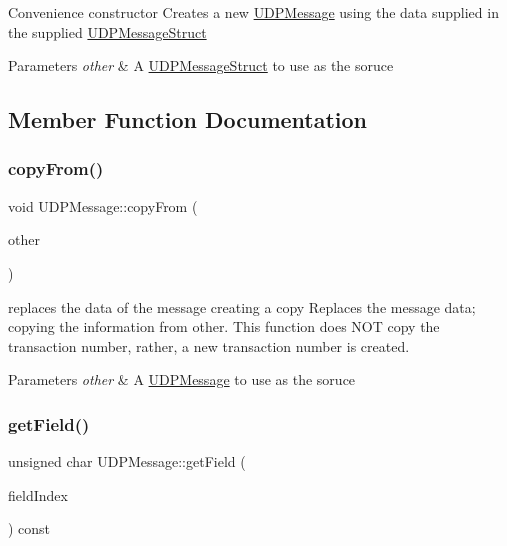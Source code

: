Convenience constructor Creates a new \hyperlink{class_u_d_p_message}{U\+D\+P\+Message} using the data supplied in the supplied \hyperlink{struct_u_d_p_message_struct}{U\+D\+P\+Message\+Struct} 
\begin{DoxyParams}{Parameters}
{\em other} & A \hyperlink{struct_u_d_p_message_struct}{U\+D\+P\+Message\+Struct} to use as the soruce \\
\hline
\end{DoxyParams}


\subsection{Member Function Documentation}
\mbox{\label{class_u_d_p_message_a313c116a2f7f0f134745ed0c4a759733}} 
\subsubsection{\texorpdfstring{copy\+From()}{copyFrom()}}
{\footnotesize\ttfamily void U\+D\+P\+Message\+::copy\+From (\begin{DoxyParamCaption}\item[{const \hyperlink{class_u_d_p_message}{U\+D\+P\+Message} \&}]{other }\end{DoxyParamCaption})\hspace{0.3cm}{\ttfamily [inline]}}

replaces the data of the message creating a copy Replaces the message data; copying the information from other. This function does N\+OT copy the transaction number, rather, a new transaction number is created. 
\begin{DoxyParams}{Parameters}
{\em other} & A \hyperlink{class_u_d_p_message}{U\+D\+P\+Message} to use as the soruce \\
\hline
\end{DoxyParams}
\mbox{\label{class_u_d_p_message_a869585e0916d3b9edf99111f8fc74709}} 
\subsubsection{\texorpdfstring{get\+Field()}{getField()}}
{\footnotesize\ttfamily unsigned char U\+D\+P\+Message\+::get\+Field (\begin{DoxyParamCaption}\item[{unsigned char}]{field\+Index }\end{DoxyParamCaption}) const\hspace{0.3cm}{\ttfamily [inline]}}

